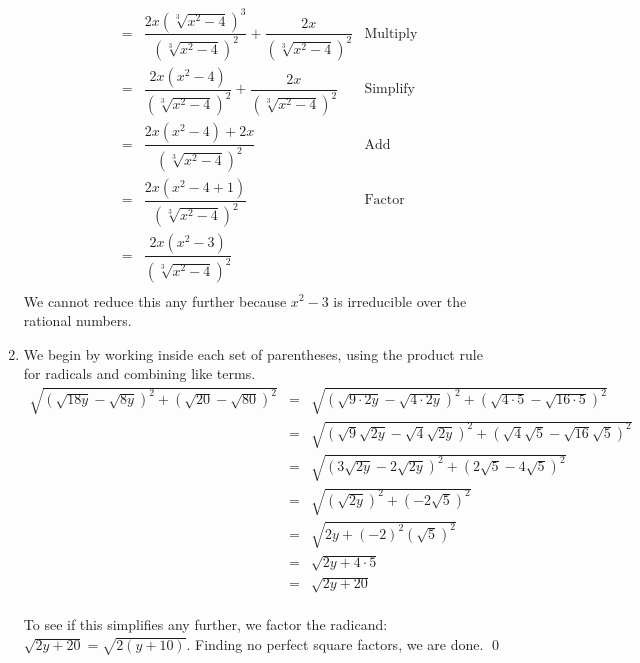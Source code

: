 \documentclass{ximera}
\begin{document}
\begin{example}
\begin{enumerate}
\[\begin{array}{rclr}
& = & \dfrac{2x(\sqrt[3]{x^2-4})^3}{(\sqrt[3]{x^2-4})^2} + \dfrac{2x}{(\sqrt[3]{x^2-4})^2} & \text{Multiply}\\[12pt]

& = & \dfrac{2x(x^2-4)}{(\sqrt[3]{x^2-4})^2} + \dfrac{2x}{(\sqrt[3]{x^2-4})^2} & \text{Simplify}\\ [12pt]

& = & \dfrac{2x(x^2-4) + 2x}{(\sqrt[3]{x^2-4})^2} & \text{Add} \\ [12pt]


& = & \dfrac{2x(x^2-4 +1)}{(\sqrt[3]{x^2-4})^2} & \text{Factor}\\ [12pt]


& = & \dfrac{2x(x^2-3)}{(\sqrt[3]{x^2-4})^2} & \\

\end{array}\] We cannot reduce this any further because $x^2 - 3$ is irreducible over the rational numbers. 


\item  We begin by working inside each set of parentheses, using the product rule for radicals and combining like terms.\[ \begin{array}{rclr}


 \sqrt{(\sqrt{18y} - \sqrt{8y})^2 + (\sqrt{20} - \sqrt{80})^2} & = & \sqrt{(\sqrt{9\cdot 2y} - \sqrt{4 \cdot 2y})^2 + (\sqrt{4\cdot 5} - \sqrt{16 \cdot 5})^2} & \\[8pt]

& = & \sqrt{(\sqrt{9} \sqrt{2y} - \sqrt{4}\sqrt{2y})^2 + (\sqrt{4}\sqrt{5} - \sqrt{16}\sqrt{5})^2} & \\[8pt]


& = & \sqrt{(3\sqrt{2y} - 2\sqrt{2y})^2 + (2\sqrt{5} - 4\sqrt{5})^2} & \\[8pt]

& = & \sqrt{(\sqrt{2y})^2 + (-2\sqrt{5})^2} & \\[8pt]


& = & \sqrt{2y + (-2)^2(\sqrt{5})^2} & \\[8pt]


& = & \sqrt{2y + 4\cdot 5} & \\[8pt]

& = & \sqrt{2y + 20} & \\ 

\end{array} \]

To see if this simplifies any further, we factor the radicand:  $\sqrt{2y+20} = \sqrt{2(y+10)}$.  Finding no perfect square factors, we are done. \qed

\end{enumerate}

\end{example}
\end{document}
